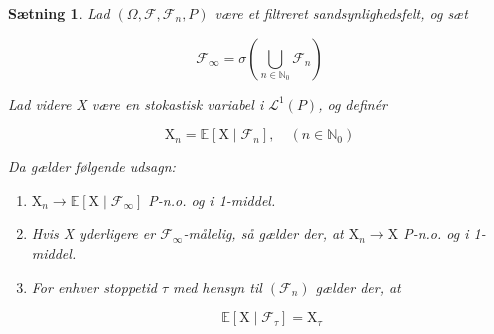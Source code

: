 \documentclass{article}
\newcommand{\1}{\mathbbm{1}}
\theoremstyle{boxed}
\newtheorem{proposition}[theorem]{Sætning}
\begin{document}
\begin{theorem-box}
    \begin{proposition}
        Lad $\left(\Omega, \mathcal{F}, \mathcal{F}_n, P\right)$ være et filtreret sandsynlighedsfelt, og sæt

$$
\mathcal{F}_{\infty}=\sigma\left(\bigcup_{n \in \mathbb{N}_0} \mathcal{F}_n\right)
$$


Lad videre X være en stokastisk variabel i $\mathcal{L}^1(P)$, og definér

$$
\mathrm{X}_n=\mathbb{E}\left[\mathrm{X} \mid \mathcal{F}_n\right], \quad\left(n \in \mathbb{N}_0\right)
$$


Da gælder følgende udsagn:
\begin{enumerate}
    \item[\textnormal{(i)}]$\mathrm{X}_n \rightarrow \mathbb{E}\left[\mathrm{X} \mid \mathcal{F}_{\infty}\right]$ P-n.o. og i 1-middel.
    \item[\textnormal{(ii)}]Hvis X yderligere er $\mathcal{F}_{\infty}$-målelig, så gælder der, at $\mathrm{X}_n \rightarrow \mathrm{X}$ P-n.o. og i 1-middel.
    \item[\textnormal{(iii)}] For enhver stoppetid $\tau$ med hensyn til $\left(\mathcal{F}_n\right)$ gælder der, at

    $$
    \mathbb{E}\left[\mathrm{X} \mid \mathcal{F}_\tau\right]=\mathrm{X}_\tau
    $$
\end{enumerate}
    \end{proposition}
\end{theorem-box}
\end{document}

